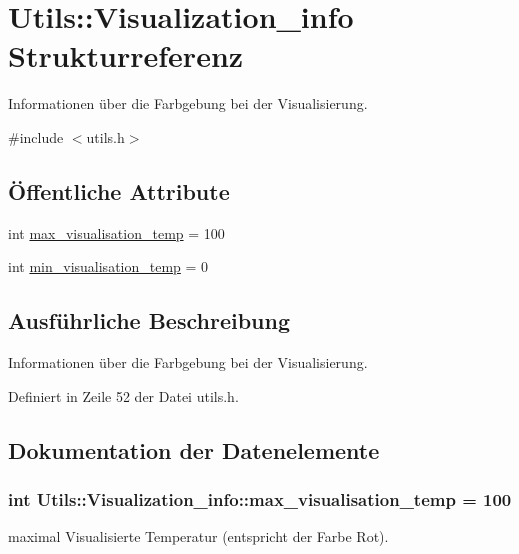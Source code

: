 \hypertarget{structUtils_1_1Visualization__info}{\section{Utils\-:\-:Visualization\-\_\-info Strukturreferenz}
\label{structUtils_1_1Visualization__info}
}


Informationen über die Farbgebung bei der Visualisierung.  




{\ttfamily \#include $<$utils.\-h$>$}

\subsection*{Öffentliche Attribute}
\begin{DoxyCompactItemize}
\item 
int \hyperlink{structUtils_1_1Visualization__info_a5327787a12634166ecc00f2224d3f39f}{max\-\_\-visualisation\-\_\-temp} = 100
\item 
int \hyperlink{structUtils_1_1Visualization__info_a6e192352d1f00709f8ef963206ff2653}{min\-\_\-visualisation\-\_\-temp} = 0
\end{DoxyCompactItemize}


\subsection{Ausführliche Beschreibung}
Informationen über die Farbgebung bei der Visualisierung. 

Definiert in Zeile 52 der Datei utils.\-h.



\subsection{Dokumentation der Datenelemente}
\hypertarget{structUtils_1_1Visualization__info_a5327787a12634166ecc00f2224d3f39f}{
\subsubsection[{max\-\_\-visualisation\-\_\-temp}]{\setlength{\rightskip}{0pt plus 5cm}int Utils\-::\-Visualization\-\_\-info\-::max\-\_\-visualisation\-\_\-temp = 100}}\label{structUtils_1_1Visualization__info_a5327787a12634166ecc00f2224d3f39f}
maximal Visualisierte Temperatur (entspricht der Farbe Rot). 

